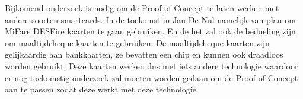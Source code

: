 \documentclass[a0,portrait]{hogent-poster}
\begin{document}
\begin{multicols}{2}
Bijkomend onderzoek is nodig om de Proof of Concept te laten werken met andere soorten smartcards. In de toekomst in Jan De Nul namelijk van plan om MiFare DESFire kaarten te gaan gebruiken. En de het zal ook de bedoeling zijn om maaltijdcheque kaarten te gebruiken. De maaltijdcheque kaarten zijn gelijkaardig aan bankkaarten, ze bevatten een chip en kunnen ook draadloos worden gebruikt. Deze kaarten werken dus met iets andere technologie waardoor er nog toekomstig onderzoek zal moeten worden gedaan om de Proof of Concept aan te passen zodat deze werkt met deze technologie.

\end{multicols}
\end{document}
